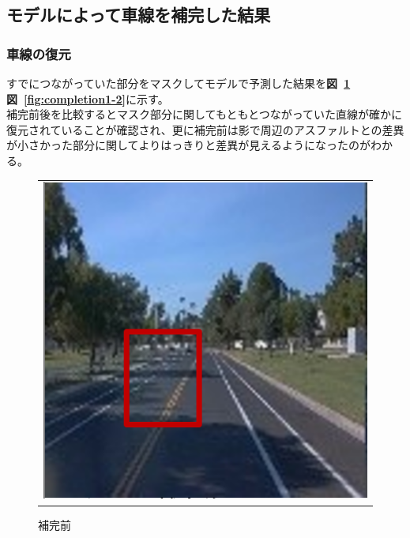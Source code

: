 \documentclass[a4j, 11pt]{jreport}
\newcommand{\figref}[1]{\textbf{図~\ref{#1}}}
\begin{document}
\subsection{モデルによって車線を補完した結果}
\subsubsection{車線の復元}
すでにつながっていた部分をマスクしてモデルで予測した結果を\figref{fig:completion1-1}\figref{fig:completion1-2}に示す。\\
補完前後を比較するとマスク部分に関してもともとつながっていた直線が確かに復元されていることが確認され、更に補完前は影で周辺のアスファルトとの差異が小さかった部分に関してよりはっきりと差異が見えるようになったのがわかる。
\begin{figure}[H]
	\centering
	  \begin{tabular}{c}
		\begin{minipage}{0.50\hsize}
		  \centering
			\includegraphics[scale=0.5]
			{images/result/completion/result1-1.png}
			\caption{補完前}
			\label{fig:completion1-1}
		\end{minipage}
   

\end{tabular}
\end{figure}
\end{document}
